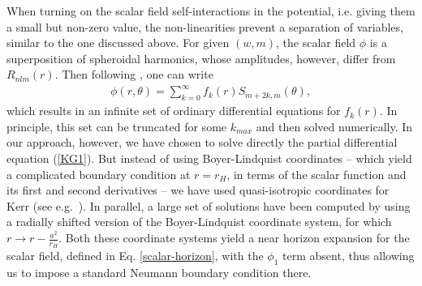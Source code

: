 When turning on the scalar field self-interactions in the potential, i.e. giving them a small but non-zero value, the non-linearities prevent a separation of variables, similar to the one discussed above. 
For given $(w,m)$,
the scalar field $\phi$ is a superposition of
spheroidal harmonics, whose amplitudes, however, differ from $R_{nlm}(r)$.
Then following \cite{Volkov:2002aj}, one can write
% 
\begin{eqnarray}
\phi(r,\theta)=\sum_{k=0}^\infty f_k(r)S_{m+2k,m} (\theta),
\end{eqnarray}
%
which results in an infinite set of ordinary differential
equations for $f_k(r)$.
In principle, this set can be truncated for some $k_{max}$
and then solved numerically.
In our approach, however, we have chosen to solve
 directly the partial differential equation (\ref{KG1}). But instead of using Boyer-Lindquist coordinates -- 
 which yield a complicated boundary condition at  $r=r_H$,  in terms of the scalar function and its first and second derivatives -- we have used quasi-isotropic coordinates for Kerr (see e.g.~\cite{Cook:2000vr}).  In parallel, a large set of solutions have been computed  by using a radially shifted version of the Boyer-Lindquist coordinate system, for which $r\to r-\frac{a^2}{r_H}$.
%
Both these coordinate systems yield a near horizon expansion for the scalar field, defined in Eq. \eqref{scalar-horizon}, with the $\phi_1$ term absent, thus allowing us to impose a standard Neumann boundary condition there.
                                                                
